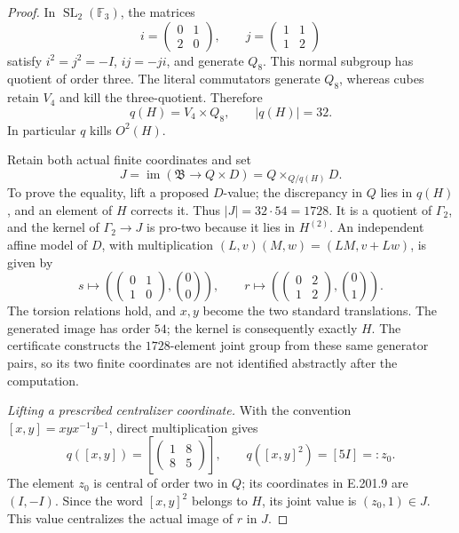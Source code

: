 \begin{proof}
In \(\operatorname{SL}_2(\mathbb F_3)\), the matrices
\[
 i=\begin{pmatrix}0&1\\2&0\end{pmatrix},\qquad
 j=\begin{pmatrix}1&1\\1&2\end{pmatrix}
\]
satisfy \(i^2=j^2=-I\), \(ij=-ji\), and generate \(Q_8\).
This normal subgroup has quotient of order three.  The literal
commutators generate \(Q_8\), whereas cubes retain \(V_4\)
and kill the three-quotient.  Therefore
\[
                  q(H)=V_4\times Q_8,
                     \qquad |q(H)|=32.
\tag{E.201.10}
\]
In particular \(q\) kills \(O^2(H)\).

Retain both actual finite coordinates and set
\[
 J=\operatorname{im}(\mathfrak B\to Q\times D)
     =Q\times_{Q/q(H)}D.
\tag{E.201.11}
\]
To prove the equality, lift a proposed \(D\)-value; the
discrepancy in \(Q\) lies in \(q(H)\), and an element of
\(H\) corrects it.  Thus \(|J|=32\cdot54=1728\).
It is a quotient of \(\Gamma_2\), and the kernel of
\(\Gamma_2\to J\) is pro-two because it lies in \(H^{(2)}\).
An independent affine model of \(D\), with multiplication
\((L,v)(M,w)=(LM,v+Lw)\), is given by
\[
 s\mapsto\left(\begin{pmatrix}0&1\\1&0\end{pmatrix},\binom00\right),
 \qquad
 r\mapsto\left(\begin{pmatrix}0&2\\1&2\end{pmatrix},\binom01\right).
\tag{E.201.12}
\]
The torsion relations hold, and \(x,y\) become the two standard
translations.  The generated image has order \(54\); the
kernel is consequently exactly \(H\).  The certificate constructs
the \(1728\)-element joint group from these same generator pairs,
so its two finite coordinates are not identified abstractly after
the computation.

\emph{Lifting a prescribed centralizer coordinate.}
With the convention \([x,y]=xyx^{-1}y^{-1}\), direct multiplication
gives
\[
 q([x,y])=\left[\begin{pmatrix}1&8\\8&5\end{pmatrix}\right],
 \qquad q([x,y]^2)=[5I]=:z_0.
\tag{E.201.13}
\]
The element \(z_0\) is central of order two in \(Q\); its
coordinates in E.201.9 are \((I,-I)\).  Since the word
\([x,y]^2\) belongs to \(H\), its joint value is
\((z_0,1)\in J\).  This value centralizes the actual image of
\(r\) in \(J\).


\end{proof}
